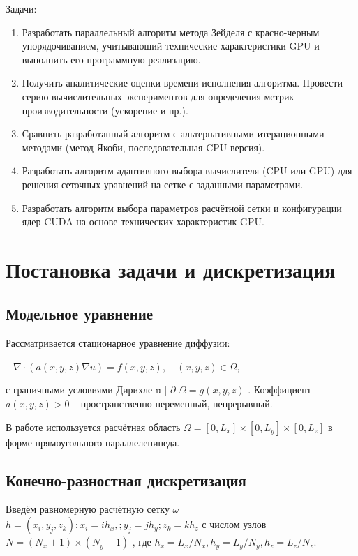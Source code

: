 \documentclass[10pt,a4paper]{book}
\begin{document}
Задачи:
\begin{enumerate}
    \item 
    Разработать параллельный алгоритм метода Зейделя с красно-черным упорядочиванием, учитывающий технические характеристики GPU и выполнить его программную реализацию.
    \item
    Получить аналитические оценки времени исполнения алгоритма.
    Провести серию вычислительных экспериментов для определения метрик производительности (ускорение и пр.).
    \item
    Сравнить разработанный алгоритм с альтернативными итерационными методами (метод Якоби, последовательная CPU-версия).
    \item
    Разработать алгоритм адаптивного выбора вычислителя (CPU или GPU) для решения сеточных уравнений на сетке с заданными параметрами.
    \item
    Разработать алгоритм выбора параметров расчётной сетки и конфигурации ядер CUDA на основе технических характеристик GPU.
\end{enumerate}

\section{Постановка задачи и дискретизация}

\subsection{Модельное уравнение}

Рассматривается стационарное уравнение диффузии:

$ -\nabla \cdot (a(x,y,z) \nabla u) = f(x,y,z), \quad (x,y,z) \in \Omega, $

с граничными условиями Дирихле u | $\partial$ $\Omega = g(x, y, z)$ .
Коэффициент $a (x, y, z) > 0$ – пространственно-переменный, непрерывный.

В работе используется расчётная область $\Omega = [0, L_x] × [0, L_y] × [0, L_z]$ в форме прямоугольного параллелепипеда.

\subsection{Конечно-разностная дискретизация}

Введём равномерную расчётную сетку $\omega$ $h = ( x_i , y_j , z_k ) : x_i = ih_x , ; y_j = jh_y ; z_k = kh_z$ с числом узлов $N = ( N_x + 1 ) × ( N_y + 1 )$ , где $h_x = L_x / N_x , h_y = L_y / N_y , h_z = L_z / N_z $.
\end{document}
